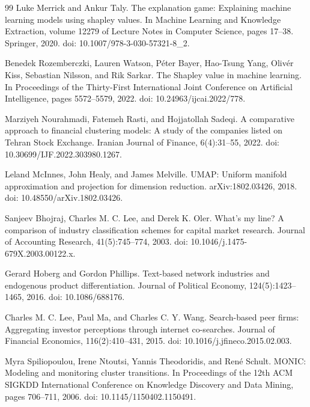 \begin{thebibliography}{99}
 Luke Merrick and Ankur Taly. The explanation game: Explaining machine learning models using shapley values. In Machine Learning and Knowledge Extraction, volume 12279 of Lecture Notes in Computer Science, pages 17--38. Springer, 2020. doi: 10.1007/978-3-030-57321-8\_2.

 Benedek Rozemberczki, Lauren Watson, P\'{e}ter Bayer, Hao-Tsung Yang, Oliv\'{e}r Kiss, Sebastian Nilsson, and Rik Sarkar. The Shapley value in machine learning. In Proceedings of the Thirty-First International Joint Conference on Artificial Intelligence, pages 5572--5579, 2022. doi: 10.24963/ijcai.2022/778.

 Marziyeh Nourahmadi, Fatemeh Rasti, and Hojjatollah Sadeqi. A comparative approach to financial clustering models: A study of the companies listed on Tehran Stock Exchange. Iranian Journal of Finance, 6(4):31--55, 2022. doi: 10.30699/IJF.2022.303980.1267.

 Leland McInnes, John Healy, and James Melville. UMAP: Uniform manifold approximation and projection for dimension reduction. arXiv:1802.03426, 2018. doi: 10.48550/arXiv.1802.03426.

 Sanjeev Bhojraj, Charles M. C. Lee, and Derek K. Oler. What's my line? A comparison of industry classification schemes for capital market research. Journal of Accounting Research, 41(5):745--774, 2003. doi: 10.1046/j.1475-679X.2003.00122.x.

 Gerard Hoberg and Gordon Phillips. Text-based network industries and endogenous product differentiation. Journal of Political Economy, 124(5):1423--1465, 2016. doi: 10.1086/688176.

 Charles M. C. Lee, Paul Ma, and Charles C. Y. Wang. Search-based peer firms: Aggregating investor perceptions through internet co-searches. Journal of Financial Economics, 116(2):410--431, 2015. doi: 10.1016/j.jfineco.2015.02.003.

 Myra Spiliopoulou, Irene Ntoutsi, Yannis Theodoridis, and Ren\'{e} Schult. MONIC: Modeling and monitoring cluster transitions. In Proceedings of the 12th ACM SIGKDD International Conference on Knowledge Discovery and Data Mining, pages 706--711, 2006. doi: 10.1145/1150402.1150491.


\end{thebibliography}
